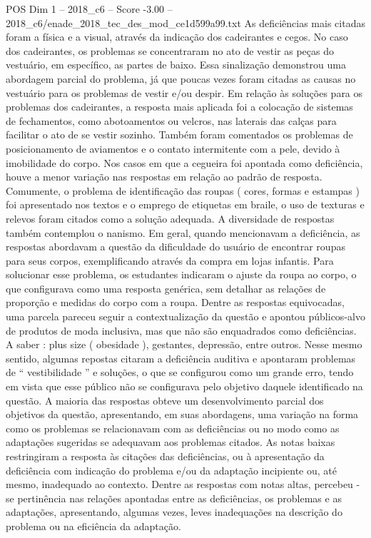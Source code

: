 \begin{textsample}{POS Dim 1 – 2018\_c6 – Score -3.00 – 2018\_c6/enade\_2018\_tec\_des\_mod\_ce1d599a99.txt}
As deficiências mais citadas foram a física e a visual, através da indicação dos cadeirantes e cegos.
No caso dos cadeirantes, os problemas se concentraram no ato de vestir as peças do vestuário, em específico, as partes de baixo.
Essa sinalização demonstrou uma abordagem parcial do problema, já que poucas vezes foram citadas as causas no vestuário para os problemas de vestir e/ou despir.
Em relação às soluções para os problemas dos cadeirantes, a resposta mais aplicada foi a colocação de sistemas de fechamentos, como abotoamentos ou velcros, nas laterais das calças para facilitar o ato de se vestir sozinho.
Também foram comentados os problemas de posicionamento de aviamentos e o contato intermitente com a pele, devido à imobilidade do corpo.
Nos casos em que a cegueira foi apontada como deficiência, houve a menor variação nas respostas em relação ao padrão de resposta.
Comumente, o problema de identificação das roupas ( cores, formas e estampas ) foi apresentado nos textos e o emprego de etiquetas em braile, o uso de texturas e relevos foram citados como a solução adequada.
A diversidade de respostas também contemplou o nanismo.
Em geral, quando mencionavam a deficiência, as respostas abordavam a questão da dificuldade do usuário de encontrar roupas para seus corpos, exemplificando através da compra em lojas infantis.
Para solucionar esse problema, os estudantes indicaram o ajuste da roupa ao corpo, o que configurava como uma resposta genérica, sem detalhar as relações de proporção e medidas do corpo com a roupa.
Dentre as respostas equivocadas, uma parcela pareceu seguir a contextualização da questão e apontou públicos-alvo de produtos de moda inclusiva, mas que não são enquadrados como deficiências.
A saber : plus size ( obesidade ), gestantes, depressão, entre outros.
Nesse mesmo sentido, algumas repostas citaram a deficiência auditiva e apontaram problemas de “ vestibilidade ” e soluções, o que se configurou como um grande erro, tendo em vista que esse público não se configurava pelo objetivo daquele identificado na questão.
A maioria das respostas obteve um desenvolvimento parcial dos objetivos da questão, apresentando, em suas abordagens, uma variação na forma como os problemas se relacionavam com as deficiências ou no modo como as adaptações sugeridas se adequavam aos problemas citados.
As notas baixas restringiram a resposta às citações das deficiências, ou à apresentação da deficiência com indicação do problema e/ou da adaptação incipiente ou, até mesmo, inadequado ao contexto.
Dentre as respostas com notas altas, percebeu -se pertinência nas relações apontadas entre as deficiências, os problemas e as adaptações, apresentando, algumas vezes, leves inadequações na descrição do problema ou na eficiência da adaptação.

\end{textsample}
